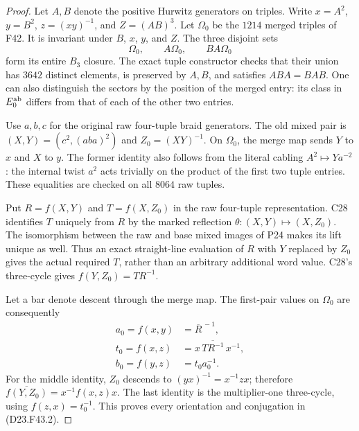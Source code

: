\begin{proof}
Let $A,B$ denote the positive Hurwitz generators on triples.
Write $x=A^2$, $y=B^2$, $z=(xy)^{-1}$, and
$Z=(AB)^3$. Let $\Omega_0$ be the $1214$ merged triples
of F42. It is invariant under $B$, $x$, $y$, and $Z$.
The three disjoint sets
\[
                   \Omega_0,\qquad A\Omega_0,
                     \qquad BA\Omega_0
                                                        \tag{D23.F43.1}
\]
form its entire $B_3$ closure. The exact tuple constructor
checks that their union has $3642$ distinct elements,
is preserved by $A,B$, and satisfies $ABA=BAB$.
One can also distinguish the sectors by the position of
the merged entry: its class in $E_0^{\rm ab}$ differs
from that of each of the other two entries.

Use $a,b,c$ for the original raw four-tuple braid generators.
The old mixed pair is $(X,Y)=(c^2,(aba)^2)$ and
$Z_0=(XY)^{-1}$. On $\Omega_0$, the merge map sends $Y$
to $x$ and $X$ to $y$. The former identity also follows
from the literal cabling $A^2\mapsto Y a^{-2}$: the
internal twist $a^2$ acts trivially on the product of
the first two tuple entries. These equalities are checked
on all $8064$ raw tuples.

Put $R=f(X,Y)$ and $T=f(X,Z_0)$ in the raw four-tuple
representation. C28 identifies $T$ uniquely from $R$ by
the marked reflection $\theta:(X,Y)\mapsto(X,Z_0)$.
The isomorphism between the raw and base mixed images
of P24 makes its lift unique as well. Thus an exact
straight-line evaluation of $R$ with $Y$ replaced by
$Z_0$ gives the actual required $T$, rather than an
arbitrary additional word value. C28's three-cycle gives
$f(Y,Z_0)=TR^{-1}$.

Let a bar denote descent through the merge map. The
first-pair values on $\Omega_0$ are consequently
\[
 \begin{split}
 a_0=f(x,y)&=\overline{R}^{\,-1},\\
 t_0=f(x,z)&=x\,\overline{TR^{-1}}\,x^{-1},\\
 b_0=f(y,z)&=t_0a_0^{-1}.
 \end{split}
                                                        \tag{D23.F43.2}
\]
For the middle identity, $Z_0$ descends to
$(yx)^{-1}=x^{-1}zx$; therefore
$\overline{f(Y,Z_0)}=x^{-1}f(x,z)x$.
The last identity is the multiplier-one three-cycle,
using $f(z,x)=t_0^{-1}$. This proves every orientation
and conjugation in (D23.F43.2).


\end{proof}
